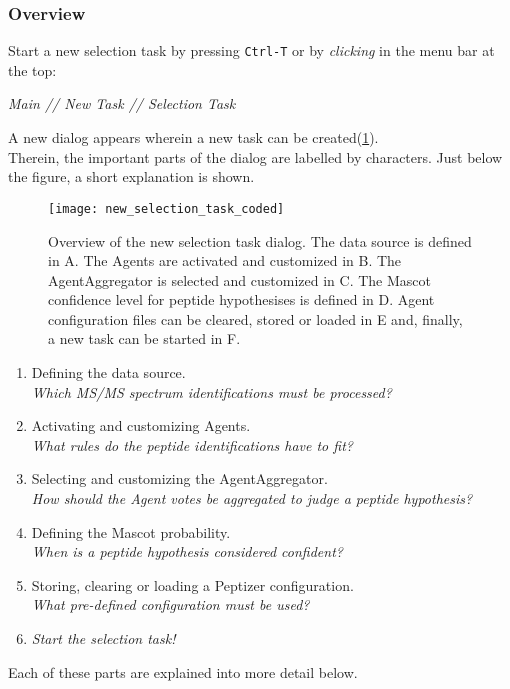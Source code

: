 \subsubsection{Overview}
\npar Start a new selection task by pressing \verb!Ctrl-T! or by \textit{clicking } in the menu bar at the top:
%
\begin{center}
\textit{Main // New Task // Selection Task}	
\end{center}
%
%
\npar A new dialog appears wherein a new task can be created(\ref{new_selection_task_coded}). \\Therein, the important parts of the dialog are labelled by characters. Just below the figure, a short explanation is shown.
%
\pagebreak
\begin{figure}[H]
\begin{center}
	\texttt{[image: new\_selection\_task\_coded]}
	\caption{\label{new_selection_task_coded} Overview of the new selection task dialog. The data source is defined in A. The Agents are activated and customized in B. The AgentAggregator is selected and customized in C. The Mascot confidence level for peptide hypothesises is defined in D. Agent configuration files can be cleared, stored or loaded in E and, finally, a new task can be started in F.}
\end{center}
\end{figure}
%
\renewcommand{\labelenumi}{\Alph{enumi}.}
\begin{enumerate}
	\item Defining the data source.\\\textit{Which MS/MS spectrum identifications must be processed?}
	\item Activating and customizing Agents.\\\textit{What rules do the peptide identifications have to fit?}
	\item Selecting and customizing the AgentAggregator.\\\textit{How should the Agent votes be aggregated to judge a peptide hypothesis?}
	\item Defining the Mascot probability.\\\textit{When is a peptide hypothesis considered confident?}
	\item Storing, clearing or loading a Peptizer configuration.\\\textit{What pre-defined configuration must be used?}
	\item \textit{Start the selection task!}
\end{enumerate}
\npar Each of these parts are explained into more detail below.
%
%
